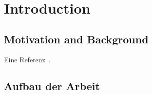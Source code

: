\chapter{Introduction}
\section{Motivation and Background}
Eine Referenz~\cite{AggarwalV88}.
\section{Aufbau der Arbeit}